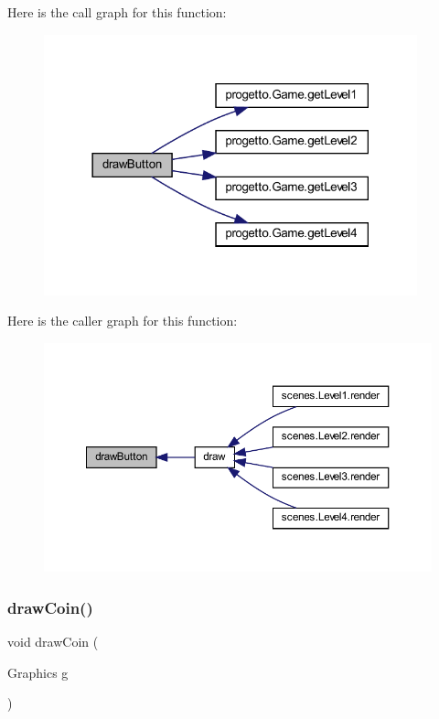 Here is the call graph for this function\+:\nopagebreak
\begin{figure}[H]
\begin{center}
\leavevmode
\includegraphics[width=306pt]{classui_1_1_action_bar_a65768678909bc0512c6cb9780709ad38_cgraph}
\end{center}
\end{figure}
Here is the caller graph for this function\+:\nopagebreak
\begin{figure}[H]
\begin{center}
\leavevmode
\includegraphics[width=350pt]{classui_1_1_action_bar_a65768678909bc0512c6cb9780709ad38_icgraph}
\end{center}
\end{figure}
\mbox{\label{classui_1_1_action_bar_ae07c200235fb700738b8194a93dbb8fb}} 
\subsubsection{\texorpdfstring{draw\+Coin()}{drawCoin()}}
{\footnotesize\ttfamily void draw\+Coin (\begin{DoxyParamCaption}\item[{Graphics}]{g }\end{DoxyParamCaption})}



